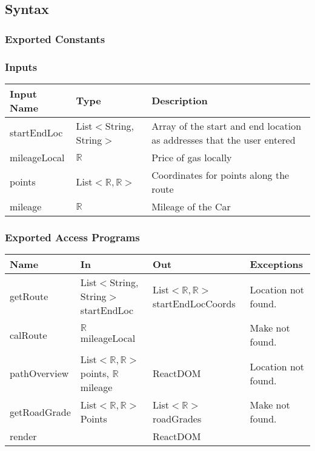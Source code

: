 \documentclass[12pt, titlepage]{article}
\begin{document}
\subsection{Syntax}

\subsubsection{Exported Constants}

\subsubsection{Inputs}
\begin{tabular}{| l | l | l |}
  \hline
  \textbf{Input Name} & \textbf{Type} & \textbf{Description}\\
  \hline
  startEndLoc & List$<$String, String$>$ & Array of the start and end location as addresses that the user entered \\
  \hline
  mileageLocal & $\mathbb{R}$ & Price of gas locally \\
  \hline
  points & List$<\mathbb{R},\mathbb{R}>$  & Coordinates for points along the route \\
  \hline
  mileage & $\mathbb{R}$ & Mileage of the Car \\
  \hline
\end{tabular}

\subsubsection{Exported Access Programs}

\begin{tabular}{| l | l | l | l |}
  \hline
  \textbf{Name} & \textbf{In} & \textbf{Out} & \textbf{Exceptions}\\
  \hline
  getRoute & List$<$String, String$>$ startEndLoc & List$<\mathbb{R},\mathbb{R}>$  startEndLocCoords & Location not found.\\
  \hline
  calRoute & $\mathbb{R}$ mileageLocal & ~ & Make not found.\\
  \hline
  pathOverview & List$<\mathbb{R},\mathbb{R}>$ points, $\mathbb{R}$ mileage  & ReactDOM & Location not found.\\
  \hline
  getRoadGrade & List$<\mathbb{R},\mathbb{R}>$ Points & List$<\mathbb{R}>$ roadGrades & Make not found.\\
  \hline
  render & ~ & ReactDOM & ~\\
  \hline
\end{tabular}
\end{document}
